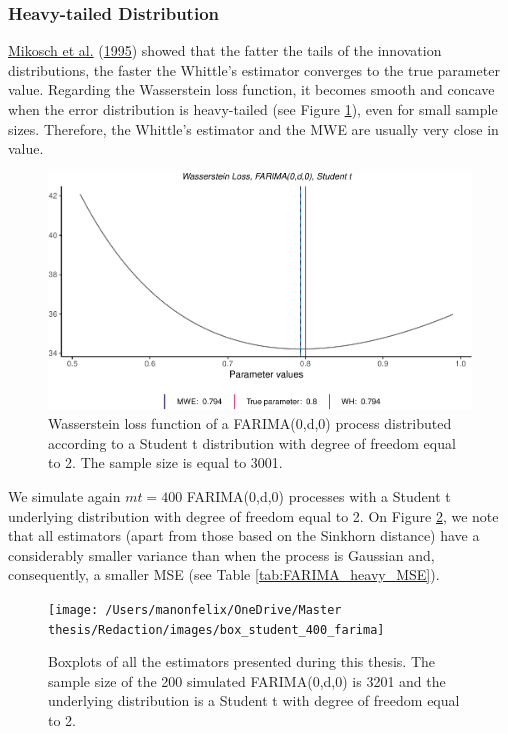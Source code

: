 \documentclass[
  11pt,
]{article}
\begin{document}
\hypertarget{heavy-tailed-distribution}{%
\subsubsection{Heavy-tailed
Distribution}\label{heavy-tailed-distribution}}

\protect\hyperlink{ref-mikosch1995parameter}{Mikosch et al.}
(\protect\hyperlink{ref-mikosch1995parameter}{1995}) showed that the
fatter the tails of the innovation distributions, the faster the
Whittle's estimator converges to the true parameter value. Regarding the
Wasserstein loss function, it becomes smooth and concave when the error
distribution is heavy-tailed (see Figure \ref{fig:student_t}), even for
small sample sizes. Therefore, the Whittle's estimator and the MWE are
usually very close in value.

\begin{figure}

{\centering \includegraphics[width=0.6\linewidth]{Master_thesis_V2_files/figure-latex/student_t-1} 

}

\caption{Wasserstein loss function of a FARIMA(0,d,0) process distributed according to a Student t distribution with degree of freedom equal to 2. The sample size is equal to 3001.}\label{fig:student_t}
\end{figure}

We simulate again \(mt = 400\) FARIMA(0,d,0) processes with a Student t
underlying distribution with degree of freedom equal to 2. On Figure
\ref{fig:box_farima_student}, we note that all estimators (apart from
those based on the Sinkhorn distance) have a considerably smaller
variance than when the process is Gaussian and, consequently, a smaller
MSE (see Table \ref{tab:FARIMA_heavy_MSE}).

\begin{figure}

{\centering \texttt{[image: /Users/manonfelix/OneDrive/Master thesis/Redaction/images/box\_student\_400\_farima]} 

}

\caption{Boxplots of all the estimators presented during this thesis. The sample size of the 200 simulated FARIMA(0,d,0) is 3201 and the underlying distribution is a Student t with degree of freedom equal to 2.}\label{fig:box_farima_student}
\end{figure}
\end{document}
